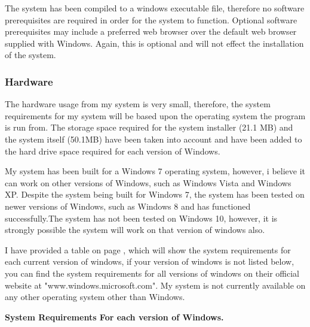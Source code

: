The system has been compiled to a windows executable file, therefore no software prerequisites are required in order for the system to function. Optional software prerequisites may include a preferred web browser over the default web browser supplied with Windows. Again, this is optional and will not effect the installation of the system.

\subsubsection{Hardware}

The hardware usage from my system is very small, therefore, the system requirements for my system will be based upon the operating system the program is run from. The storage space required for the system installer (21.1 MB) and the system itself (50.1MB) have been taken into account and have been added to the hard drive space required for each version of Windows.

 My system has been built for a Windows 7 operating system, however, i believe it can work on other versions of Windows, such as Windows Vista and Windows XP. Despite the system being built for Windows 7, the system has been tested on newer versions of Windows, such as Windows 8 and has functioned successfully.The system has not been tested on Windows 10, however, it is strongly possible the system will work on that version of windows also. 

I have provided a table on page \pageref{hardware-table}, which will show the system requirements for each current version of windows, if your version of windows is not listed below, you can find the system requirements for all versions of windows on their official website at "www.windows.microsoft.com". My system is not currently available on any other operating system other than Windows.

\pagebreak

\textbf{System Requirements For each version of Windows.} \newline

